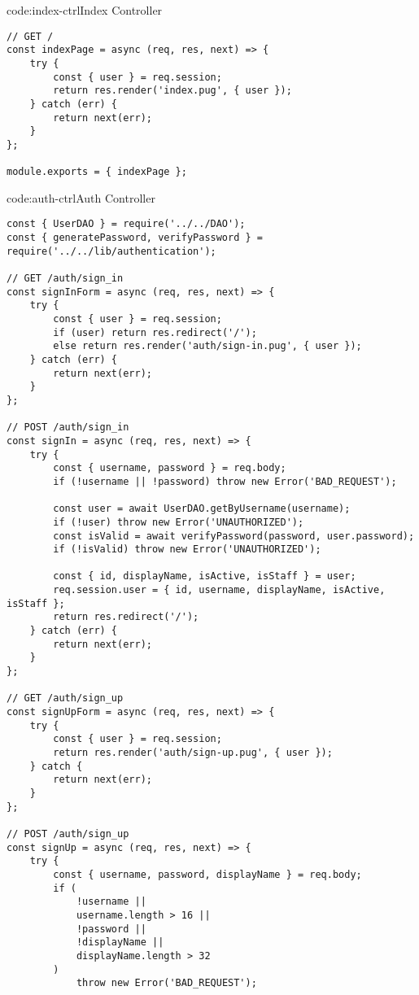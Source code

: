 \begin{codeenv}{code:index-ctrl}{Index Controller}\begin{verbatim}
// GET /
const indexPage = async (req, res, next) => {
    try {
        const { user } = req.session;
        return res.render('index.pug', { user });
    } catch (err) {
        return next(err);
    }
};

module.exports = { indexPage };
\end{verbatim}
\end{codeenv}

\begin{codeenv}{code:auth-ctrl}{Auth Controller}\begin{verbatim}
const { UserDAO } = require('../../DAO');
const { generatePassword, verifyPassword } = require('../../lib/authentication');

// GET /auth/sign_in
const signInForm = async (req, res, next) => {
    try {
        const { user } = req.session;
        if (user) return res.redirect('/');
        else return res.render('auth/sign-in.pug', { user });
    } catch (err) {
        return next(err);
    }
};

// POST /auth/sign_in
const signIn = async (req, res, next) => {
    try {
        const { username, password } = req.body;
        if (!username || !password) throw new Error('BAD_REQUEST');

        const user = await UserDAO.getByUsername(username);
        if (!user) throw new Error('UNAUTHORIZED');
        const isValid = await verifyPassword(password, user.password);
        if (!isValid) throw new Error('UNAUTHORIZED');

        const { id, displayName, isActive, isStaff } = user;
        req.session.user = { id, username, displayName, isActive, isStaff };
        return res.redirect('/');
    } catch (err) {
        return next(err);
    }
};

// GET /auth/sign_up
const signUpForm = async (req, res, next) => {
    try {
        const { user } = req.session;
        return res.render('auth/sign-up.pug', { user });
    } catch {
        return next(err);
    }
};

// POST /auth/sign_up
const signUp = async (req, res, next) => {
    try {
        const { username, password, displayName } = req.body;
        if (
            !username ||
            username.length > 16 ||
            !password ||
            !displayName ||
            displayName.length > 32
        )
            throw new Error('BAD_REQUEST');


\end{verbatim}
\end{codeenv}
